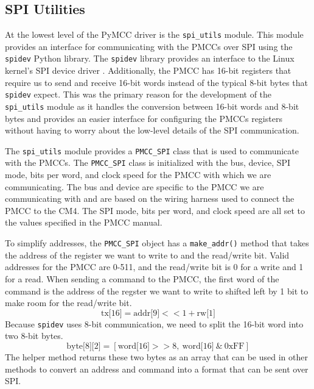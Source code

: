 \subsection{SPI Utilities}
At the lowest level of the PyMCC driver is the \verb|spi_utils| module.
This module provides an interface for communicating with the PMCCs over SPI using the \verb|spidev| Python library.
The \verb|spidev| library provides an interface to the Linux kernel's SPI device driver \cite{spidev}.
Additionally, the PMCC has 16-bit registers that require us to send and receive 16-bit words instead of the typical 8-bit bytes that \verb|spidev| expect. 
This was the primary reason for the development of the \verb|spi_utils| module as it handles the conversion between 16-bit words and 8-bit bytes and provides an easier interface for configuring the PMCCs registers without having to worry about the low-level details of the SPI communication.

The \verb|spi_utils| module provides a \verb|PMCC_SPI| class that is used to communicate with the PMCCs.
The \verb|PMCC_SPI| class is initialized with the bus, device, SPI mode, bits per word, and clock speed for the PMCC with which we are communicating.
The bus and device are specific to the PMCC we are communicating with and are based on the wiring harness used to connect the PMCC to the CM4.
The SPI mode, bits per word, and clock speed are all set to the values specified in the PMCC manual.

To simplify addresses, the \verb|PMCC_SPI| object has a \verb|make_addr()| method that takes the address of the register we want to write to and the read/write bit.
Valid addresses for the PMCC are 0-511, and the read/write bit is 0 for a write and 1 for a read.
When sending a command to the PMCC, the first word of the command is the address of the regster we want to write to shifted left by 1 bit to make room for the read/write bit.
\begin{equation}
    \text{tx[16]} = \text{addr[9]} << 1 + \text{rw[1]}
\end{equation}
Because \verb|spidev| uses 8-bit communication, we need to split the 16-bit word into two 8-bit bytes.
\begin{equation}
    \label{eq:split_word}
    \text{byte[8][2]} = [\text{word[16]} >> 8,\ \text{word[16]}\ \text{\&}\ \text{0xFF}]
\end{equation}
The helper method returns these two bytes as an array that can be used in other methods to convert an address and command into a format that can be sent over SPI.

